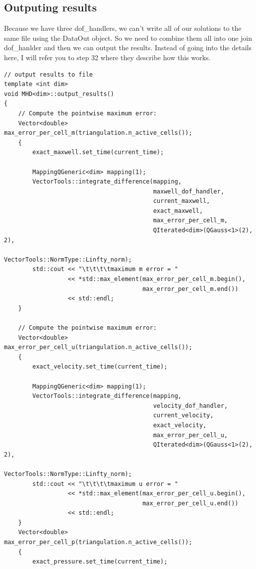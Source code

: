 \documentclass{article}
\begin{document}
\subsection*{Outputing results}
Because we have three dof\_handlers, we can't write all of our solutions to the same file using the DataOut object. So we need to combine them all into one join dof\_hanlder and then we can output the results. Instead of going into the details here, I will refer you to step 32 where they describe how this works.
\begin{lstlisting}
// output results to file
template <int dim>
void MHD<dim>::output_results()
{
    // Compute the pointwise maximum error:
    Vector<double> max_error_per_cell_m(triangulation.n_active_cells());
    {
        exact_maxwell.set_time(current_time);

        MappingQGeneric<dim> mapping(1);
        VectorTools::integrate_difference(mapping,
                                          maxwell_dof_handler,
                                          current_maxwell,
                                          exact_maxwell,
                                          max_error_per_cell_m,
                                          QIterated<dim>(QGauss<1>(2), 2),
                                          VectorTools::NormType::Linfty_norm);
        std::cout << "\t\t\t\tmaximum m error = "
                  << *std::max_element(max_error_per_cell_m.begin(),
                                       max_error_per_cell_m.end())
                  << std::endl;
    }

    // Compute the pointwise maximum error:
    Vector<double> max_error_per_cell_u(triangulation.n_active_cells());
    {
        exact_velocity.set_time(current_time);

        MappingQGeneric<dim> mapping(1);
        VectorTools::integrate_difference(mapping,
                                          velocity_dof_handler,
                                          current_velocity,
                                          exact_velocity,
                                          max_error_per_cell_u,
                                          QIterated<dim>(QGauss<1>(2), 2),
                                          VectorTools::NormType::Linfty_norm);
        std::cout << "\t\t\t\tmaximum u error = "
                  << *std::max_element(max_error_per_cell_u.begin(),
                                       max_error_per_cell_u.end())
                  << std::endl;
    }
    Vector<double> max_error_per_cell_p(triangulation.n_active_cells());
    {
        exact_pressure.set_time(current_time);


\end{lstlisting}
\end{document}

